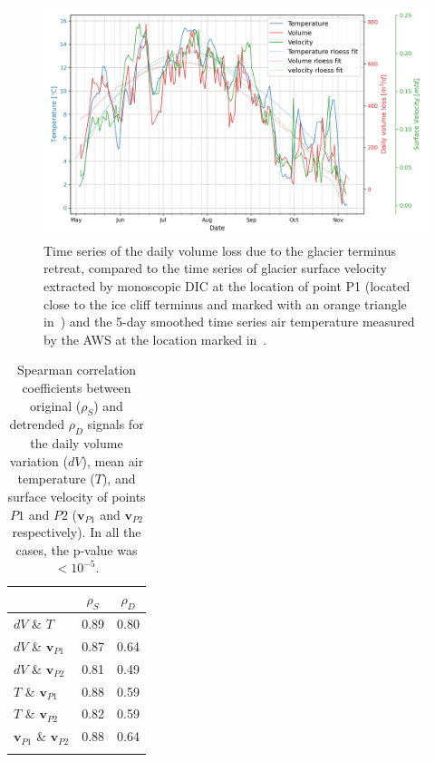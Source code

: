 \begin{figure}
  \centering
  \includegraphics[width=1\textwidth]{4_TS_P1.png}
  \caption{Time series of the daily volume loss due to the glacier terminus retreat,
    compared to the time series of glacier surface velocity extracted by monoscopic DIC at the location of point P1 (located close to the ice cliff terminus and marked with an orange triangle in~) and the 5-day smoothed time series air temperature measured by the AWS at the location marked in~.}
  \label{fig:4:TS_punto-fronte}
\end{figure}


\begin{table}
  \centering
  \caption{Spearman correlation coefficients between original (\(\rho_S\))
    and detrended \(\rho_D\) signals for the daily volume variation (\(dV\)), mean air
    temperature
    (\(T\)), and surface velocity of points \(P1\) and \(P2\) (\(\mathbf{v}_{P1}\) and
    \(\mathbf{v}_{P2}\) respectively).
    In all the cases, the p-value was \(< 10^{-5}\).}
  \label{tab:4:correlation_coefficients}
  \begin{tabular}{lcc}
                                               & \(\rho_S\) & \(\rho_D\) \\
    \hline\noalign{\smallskip}

    \(dV\) \& \(T\)                            & 0.89       & 0.80       \\
    \(dV\) \& \(\mathbf{v}_{P1}\)              & 0.87       & 0.64       \\
    \(dV\) \& \(\mathbf{v}_{P2}\)              & 0.81       & 0.49       \\
    \(T\) \&  \(\mathbf{v}_{P1}\)              & 0.88       & 0.59       \\
    \(T\) \&  \(\mathbf{v}_{P2}\)              & 0.82       & 0.59       \\
    \(\mathbf{v}_{P1}\) \& \(\mathbf{v}_{P2}\) & 0.88       & 0.64       \\
    \noalign{\smallskip}\hline
  \end{tabular}
\end{table}

